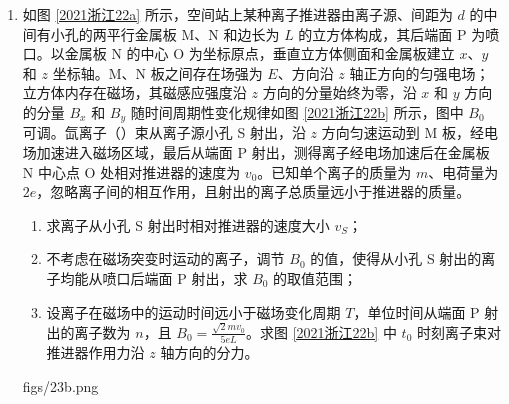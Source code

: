 \documentclass[\gkver]{gaokaozhenti}
\begin{document}
\begin{enumerate}
{	

	（4）考虑自感的情况下，线框会产生自感电动势阻碍电流的增加，因此电流是缓慢增加的，过一段时间电路达到稳定后自感消失，电流的峰值和之前大小相同，在 $1.0\times10^{-3}\Us\sim5.0\times10^{-3}\Us$ 时间内电路中的磁通量不变化电流要减小为零，因此自感电动势会阻碍电流的减小，使得电流缓慢减小为零，电流图像如图

}

\item
如图 \ref{2021浙江22a} 所示，空间站上某种离子推进器由离子源、间距为 $d$ 的中间有小孔的两平行金属板 M、N 和边长为 $L$ 的立方体构成，其后端面 P 为喷口。以金属板 N 的中心 O 为坐标原点，垂直立方体侧面和金属板建立 $x$、$y$ 和 $z$ 坐标轴。M、N 板之间存在场强为 $E$、方向沿 $z$ 轴正方向的匀强电场；立方体内存在磁场，其磁感应强度沿 $z$ 方向的分量始终为零，沿 $x$ 和 $y$ 方向的分量 $B_x$ 和 $B_y$ 随时间周期性变化规律如图 \ref{2021浙江22b} 所示，图中 $B_0$ 可调。氙离子（）束从离子源小孔 S 射出，沿 $z$ 方向匀速运动到 M 板，经电场加速进入磁场区域，最后从端面 P 射出，测得离子经电场加速后在金属板 N 中心点 O 处相对推进器的速度为 $v_0$。已知单个离子的质量为 $m$、电荷量为 $2e$，忽略离子间的相互作用，且射出的离子总质量远小于推进器的质量。

\begin{enumerate}
	\item
	求离子从小孔 S 射出时相对推进器的速度大小 $v_S$；
	\item
	不考虑在磁场突变时运动的离子，调节 $B_0$ 的值，使得从小孔 S 射出的离子均能从喷口后端面 P 射出，求 $B_0$ 的取值范围；
	\item
	设离子在磁场中的运动时间远小于磁场变化周期 $T$，单位时间从端面 P 射出的离子数为 $n$，且 $B_0=\frac{\sqrt 2 mv_0}{5eL}$。求图 \ref{2021浙江22b} 中 $t_0$ 时刻离子束对推进器作用力沿 $z$ 轴方向的分力。
\end{enumerate}

{figs/23b.png}

\end{enumerate}
\end{document}
